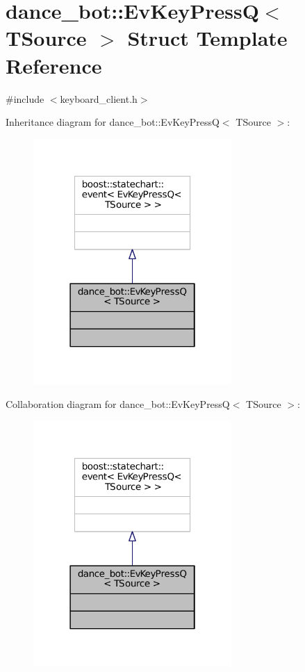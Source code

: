 \hypertarget{structdance__bot_1_1EvKeyPressQ}{}\section{dance\+\_\+bot\+:\+:Ev\+Key\+PressQ$<$ T\+Source $>$ Struct Template Reference}
\label{structdance__bot_1_1EvKeyPressQ}


{\ttfamily \#include $<$keyboard\+\_\+client.\+h$>$}



Inheritance diagram for dance\+\_\+bot\+:\+:Ev\+Key\+PressQ$<$ T\+Source $>$\+:
\nopagebreak
\begin{figure}[H]
\begin{center}
\leavevmode
\includegraphics[width=214pt]{structdance__bot_1_1EvKeyPressQ__inherit__graph}
\end{center}
\end{figure}


Collaboration diagram for dance\+\_\+bot\+:\+:Ev\+Key\+PressQ$<$ T\+Source $>$\+:
\nopagebreak
\begin{figure}[H]
\begin{center}
\leavevmode
\includegraphics[width=214pt]{structdance__bot_1_1EvKeyPressQ__coll__graph}
\end{center}
\end{figure}


